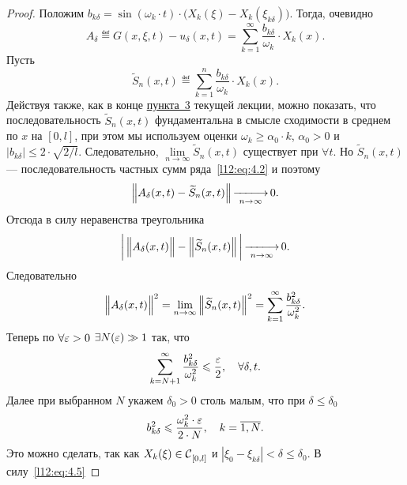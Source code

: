 \begin{proof}
	Положим $b_{k\delta}=\sin(\omega_k\cdot t)\cdot\big(X_k(\xi)-X_k(\xi_{k\delta})\big)$. Тогда, очевидно
	\begin{equation}\label{l12:eq:4.2}
		A_\delta\eqdef G(x,\xi,t)-u_\delta(x,t)=\sum\limits_{k=1}^{\infty}\dfrac{b_{k\delta}}{\omega_k}\cdot X_k(x).
	\end{equation}
	Пусть
	\begin{equation*}
		\widetilde{S}_n(x,t)\eqdef\sum\limits_{k=1}^{n}\dfrac{b_{k\delta}}{\omega_k}\cdot X_k(x).
	\end{equation*}
	Действуя также, как в конце \hyperref[lecture12section3]{пункта~3} текущей лекции, можно показать, что последовательность $\widetilde{S}_n(x,t)$ фундаментальна в смысле сходимости в среднем по $x$ на $[0,l]$, при этом мы используем оценки $\omega_k\geqslant\alpha_0\cdot k$, $\alpha_0>0$ и $\displaystyle |b_{k\delta}|\leqslant2\cdot\sqrt{2/l}$. Следовательно, $\displaystyle\lim\limits_{n\to\infty}\widetilde{S}_n(x,t)$ существует при $\forall t$. Но $\widetilde{S}_n(x,t)$ --- последовательность частных сумм ряда~\eqref{l12:eq:4.2} и поэтому 
	\begin{equation*}
		\norm{A_{\delta}(x,t)-\widetilde{S}_n(x,t)}\mathop{-\!\!\!-\!\!\!-\!\!\!\longrightarrow}\limits_{n\to\infty}0.
	\end{equation*}
	Отсюда в силу неравенства треугольника 
	\begin{equation*}
		\bigg|\norm{A_{\delta}(x,t)\vphantom{\widetilde{S}_n(x,t)}}-\norm{\widetilde{S}_n(x,t)}\bigg|\mathop{-\!\!\!-\!\!\!-\!\!\!\longrightarrow}\limits_{n\to\infty}0.
	\end{equation*}
	Следовательно
	\begin{equation}\label{l12:eq:4.3}
		\norm{A_{\delta}(x,t)\vphantom{\widetilde{S}_n(x,t)}}^2=\lim\limits_{n\to\infty}\norm{\widetilde{S}_n(x,t)}^2=\sum\limits_{k=1}^{\infty}\dfrac{b_{k\delta}^2}{\omega_k^2}.
	\end{equation}
	Теперь по $\forall\eps>0$ $\exists N(\eps)\gg1$ так, что
	\begin{equation}\label{l12:eq:4.4}
		\sum\limits_{k=N+1}^{\infty}\dfrac{b_{k\delta}^2}{\omega_k^2}\leqslant\frac{\eps}{2},\quad\forall\delta,t.
	\end{equation}
	Далее при выбранном $N$ укажем $\delta_0>0$ столь малым, что при $\delta\leqslant\delta_0$
	\begin{equation}\label{l12:eq:4.5}
		b_{k\delta}^2\leqslant\dfrac{\omega_k^2\cdot\eps}{2\cdot N},\quad k=\overline{1,N}.
	\end{equation}
	Это можно сделать, так как $X_k(\xi)\in\Cfn[{[0,l]}]{}$ и $|\xi_0-\xi_{k\delta}|<\delta\leqslant\delta_0$. В силу~\eqref{l12:eq:4.5}

\end{proof}
